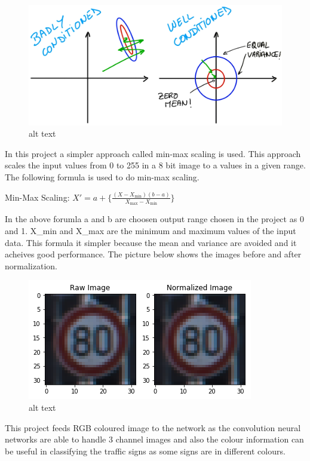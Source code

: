 \documentclass[11pt]{article}
\makeatletter
\def\maxwidth{\ifdim\Gin@nat@width>\linewidth\linewidth
    \else\Gin@nat@width\fi}
\let\Oldincludegraphics\includegraphics
\renewcommand{\includegraphics}[1]{\Oldincludegraphics[width=.8\maxwidth]{#1}}
\makeatother
\begin{document}
\begin{figure}
\centering
\includegraphics{./mean_variance.png}
\caption{alt text}
\end{figure}

In this project a simpler approach called min-max scaling is used. This
approach scales the input values from 0 to 255 in a 8 bit image to a
values in a given range. The following formula is used to do min-max
scaling.

Min-Max Scaling:
$
X'=a+\{\frac {\left(X-X_{\min }\right)\left(b-a\right)}{X_{\max }-X_{\min }}\}
$

In the above forumla a and b are choosen output range chosen in the
project as 0 and 1. X\_min and X\_max are the minimum and maximum values
of the input data. This formula it simpler because the mean and variance
are avoided and it acheives good performance. The picture below shows
the images before and after normalization.

\begin{figure}
\centering
\includegraphics{./Normalization.png}
\caption{alt text}
\end{figure}

This project feeds RGB coloured image to the network as the convolution
neural networks are able to handle 3 channel images and also the colour
information can be useful in classifying the traffic signs as some signs
are in different colours.
\end{document}
